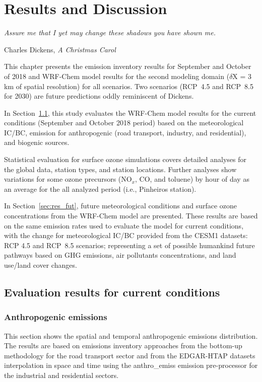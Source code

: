 \chapter{\bf Results and Discussion}\label{chap:resul}
\epigraph{\textit{Assure me that I yet may change these shadows you have shown me.}}{Charles Dickens, \textit{A Christmas Carol}}
   \noindent  This chapter presents the emission inventory results for September and October of 2018 and WRF-Chem model results for the second modeling domain ($\delta$X = 3 km of spatial resolution) for all scenarios.
   Two scenarios (RCP~4.5 and RCP~8.5 for 2030) are future predictions oddly reminiscent of Dickens.
      
   In Section~\ref{sec:res_curr}, this study evaluates the WRF-Chem model results for the current conditions (September and October 2018 period) based on the meteorological IC/BC, emission for anthropogenic (road transport, industry, and residential), and biogenic sources.
   
   Statistical evaluation for surface ozone simulations covers detailed analyses for the global data, station types, and station locations.
   Further analyses show variations for some ozone precursors (NO$_x$, CO, and toluene) by hour of day as an average for the all analyzed period (i.e., Pinheiros station).
   
   In Section~\ref{sec:res_fut}, future meteorological conditions and surface ozone concentrations from the WRF-Chem model are presented. 
   These results are based on the same emission rates used to evaluate the model for current conditions, with the change for meteorological IC/BC provided from the CESM1 datasets: RCP 4.5 and RCP~8.5 scenarios; representing a set of possible humankind future pathways based on GHG emissions, air pollutants concentrations, and land use/land cover changes.   
   
   \section{Evaluation results for current conditions}\label{sec:res_curr}
    
  \subsection{Anthropogenic emissions}\label{subsec:res_anth}
   This section shows the spatial and temporal anthropogenic emissions distribution.
   The results are based on emissions inventory approaches from the bottom-up methodology for the road transport sector \citep{Andrade2015} and from the EDGAR-HTAP datasets \citep{Janssens2015} interpolation in space and time using the anthro\_emiss emission pre-processor \citep{Kumar2020} for the industrial and residential sectors.
   
